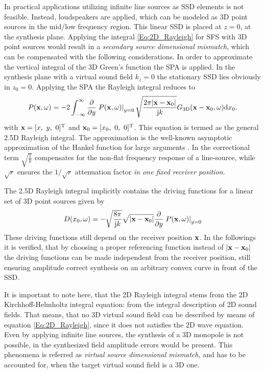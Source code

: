 In practical applications utilizing infinite line sources as SSD elements is not feasible. Instead, loudspeakers are applied, which can be modeled as 3D point sources in the mid/low frequency region. This linear SSD is placed at $z=0$, at the synthesis plane. 
Applying the integral \eqref{Eq:2D_Rayleigh} for SFS with 3D point sources would result in a \emph{secondary source dimensional mismatch}, which can be compensated with the following considerations.
In order to approximate the vertical integral of the 3D Green's function the SPA is applied. In the synthesis plane with a virtual sound field $k_z=0$ the stationary SSD lies obviously in $z_0=0$. Applying the SPA the Rayleigh integral reduces to
\begin{equation}
P(\mathbf{x},\omega) = 
-2 \int_{-\infty}^{\infty} \frac{\partial}{\partial y} \left. P(\mathbf{x},\omega) \right|_{y = 0} \sqrt{\frac{2\pi |\mathbf{x}-\mathbf{x}_0|}{\mathrm{j} k}} G_{3\mathrm{D}}(\mathbf{x} - \mathbf{x}_0,\omega) \mathrm{d} x_0.
\label{Eq:2.5D_Rayleigh}
\end{equation}
with $\mathbf{x} = [x,\ y,\ 0]^{\mathrm{T}}$ and $\mathbf{x}_0 = [x_0,\ 0,\ 0]^{\mathrm{T}}$. This equation is termed as the general 2.5D Rayleigh integral. The approximation is the well-known asymptotic approximation of the Hankel function for large arguments \cite{NIST,Olver:2010:NHMF}. In the correctional term $\sqrt{\frac{1}{k}}$ compensates for the non-flat frequency response of a line-source, while $\sqrt{r}$ ensures the $1/\sqrt{r}$ attenuation factor \emph{in one fixed receiver position}.

The 2.5D Rayleigh integral implicitly contains the driving functions for a linear set of 3D point sources given by 
\begin{equation}
D(x_0,\omega) = 
- \sqrt{\frac{8\pi}{\mathrm{j} k}} \sqrt{|\mathbf{x}-\mathbf{x}_0|} \frac{\partial}{\partial y} \left. P(\mathbf{x},\omega) \right|_{y = 0}
\label{Eq:2_5D_driv_fun_implicit}
\end{equation}
These driving functions still depend on the receiver position $\mathbf{x}$. In the followings it is verified, that by choosing a proper referencing function instead of $|\mathbf{x} - \mathbf{x}_0|$ the driving functions can be made independent from the receiver position, still ensuring amplitude correct synthesis on an arbitrary convex curve in front of the SSD.

\vspace{3mm}
It is important to note here, that the 2D Rayleigh integral stems from the 2D Kirchhoff-Helmholtz integral equation: from the integral description of 2D sound fields. That means, that no 3D virtual sound field can be described by means of equation \eqref{Eq:2D_Rayleigh}, since it does not satisfies the 2D wave equation. Even by applying infinite line sources, the synthesis of a 3D monopole is not possible, in the synthesized field amplitude errors would be present. This phenomena is referred as \emph{virtual source dimensional mismatch}, and has to be accounted for, when the target virtual sound field is a 3D one.

